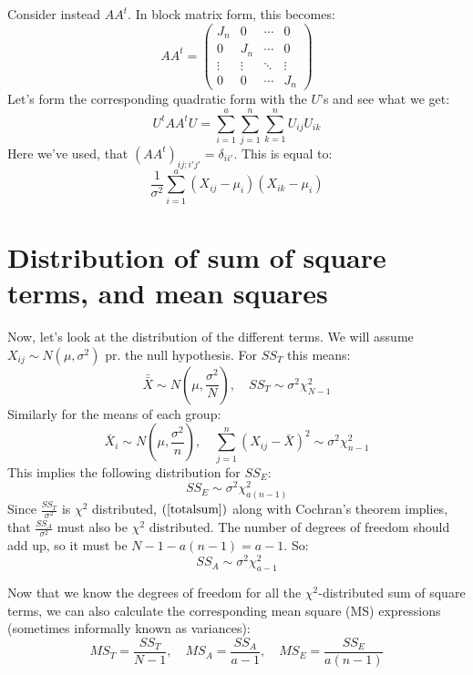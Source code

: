 \documentclass[12pt, a4paper]{article}
\newcommand*{\doublebar}[1]{\bar{\bar{#1}}}
\begin{document}
Consider instead $AA^t$. In block matrix form, this becomes:
\begin{equation}
AA^t=
\begin{pmatrix}
J_n & 0		& \cdots	& 0\\
0	& J_n	& \cdots	& 0\\
\vdots & \vdots & \ddots & \vdots \\
0	& 0		& \cdots	& J_n 
\end{pmatrix}
\end{equation}
Let's form the corresponding quadratic form with the $U$'s and see what we get:
\begin{equation}
U^tAA^t U=\sum_{i=1}^a\sum_{j=1}^n\sum_{k=1}^n U_{ij}U_{ik}
\end{equation}
Here we've used, that $(AA^t)_{ij;i'j'}=\delta_{ii'}$. This is equal to:
\begin{equation}
\frac{1}{\sigma^2}\sum_{i=1}^a(X_{ij}-\mu_i)(X_{ik}-\mu_i)
\end{equation}

\section{Distribution of sum of square terms, and mean squares}
Now, let's look at the distribution of the different terms. We will assume $X_{ij}\sim N(\mu,\sigma^2)$ pr. the null hypothesis. For $SS_T$ this means:
\begin{equation}
\doublebar{X}\sim N\left(\mu,\frac{\sigma^2}{N}\right),\quad SS_T\sim\sigma^2\chi^2_{N-1}
\end{equation}
Similarly for the means of each group:
\begin{equation}
\bar{X}_i\sim N\left(\mu,\frac{\sigma^2}{n}\right),\quad\sum_{j=1}^n\left(X_{ij}-\bar{X}\right)^2\sim\sigma^2\chi^2_{n-1}
\end{equation}
This implies the following distribution for $SS_E$:
\begin{equation}
SS_E\sim\sigma^2\chi^2_{a(n-1)} 
\end{equation}
Since $\frac{SS_T}{\sigma^2}$ is $\chi^2$ distributed, $(\ref{totalsum})$ along with Cochran's theorem implies, that $\frac{SS_A}{\sigma^2}$ must also be $\chi^2$ distributed. The number of degrees of freedom should add up, so it must be $N-1-a(n-1)=a-1$. So:
\begin{equation}
SS_A\sim\sigma^2\chi^2_{a-1}
\end{equation}
\par
Now that we know the degrees of freedom for all the $\chi^2$-distributed sum of square terms, we can also calculate the corresponding mean square (MS) expressions (sometimes informally known as variances): 
\begin{equation}
\label{msformulas}
MS_T=\frac{SS_T}{N-1},\quad MS_A=\frac{SS_A}{a-1},\quad MS_E=\frac{SS_E}{a(n-1)}
\end{equation}
\end{document}

